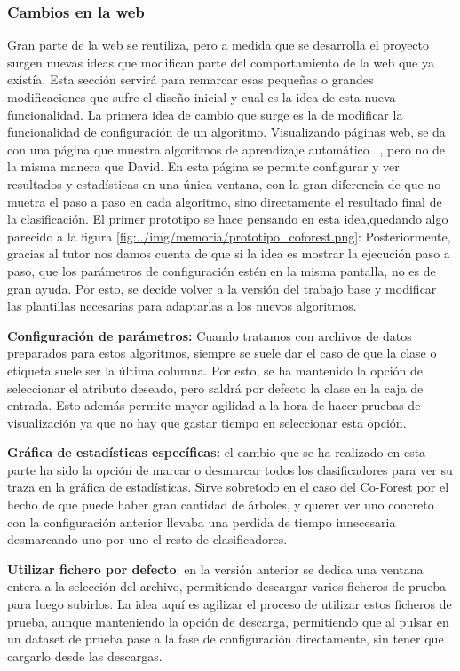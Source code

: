 \subsubsection{Cambios en la web}
Gran parte de la web se reutiliza, pero a medida que se desarrolla el proyecto surgen nuevas ideas que modifican parte del comportamiento de la web que ya existía. Esta sección servirá para remarcar esas pequeñas o grandes modificaciones que sufre el diseño inicial y cual es la idea de esta nueva funcionalidad. 
La primera idea de cambio que surge es la de modificar la funcionalidad de configuración de un algoritmo. Visualizando páginas web, se da con una página que muestra algoritmos de aprendizaje automático~ \cite{web:ml-visualizer}, pero no de la misma manera que David. En esta página se permite configurar y ver resultados y estadísticas en una única ventana, con la gran diferencia de que no muetra el paso a paso en cada algoritmo, sino directamente el resultado final de la clasificación.
El primer prototipo se hace pensando en esta idea,quedando algo parecido a la figura \ref{fig:../img/memoria/prototipo_coforest.png}:
Posteriormente, gracias al tutor nos damos cuenta de que si la idea es mostrar la ejecución paso a paso, que los parámetros de configuración estén en la misma pantalla, no es de gran ayuda. Por esto, se decide volver a la versión del trabajo base y modificar las plantillas necesarias para adaptarlas a los nuevos algoritmos.

\textbf{Configuración de parámetros:} Cuando tratamos con archivos de datos preparados para estos algoritmos, siempre se suele dar el caso de que la clase o etiqueta suele ser la última columna. Por esto, se ha mantenido la opción de seleccionar el atributo deseado, pero saldrá por defecto la clase en la caja de entrada. Esto además permite mayor agilidad a la hora de hacer pruebas de visualización ya que no hay que gastar tiempo en seleccionar esta opción.

\textbf{Gráfica de estadísticas específicas:} el cambio que se ha realizado en esta parte ha sido la opción de marcar o desmarcar todos los clasificadores para ver su traza en la gráfica de estadísticas. Sirve sobretodo en el caso del Co-Forest por el hecho de que puede haber gran cantidad de árboles, y querer ver uno concreto con la configuración anterior llevaba una perdida de tiempo innecesaria desmarcando uno por uno el resto de clasificadores.

\textbf{Utilizar fichero por defecto}: en la versión anterior se dedica una ventana entera a la selección del archivo, permitiendo descargar varios ficheros de prueba para luego subirlos. La idea aquí es agilizar el proceso de utilizar estos ficheros de prueba, aunque manteniendo la opción de descarga, permitiendo que al pulsar en un dataset de prueba pase a la fase de configuración directamente, sin tener que cargarlo desde las descargas.
